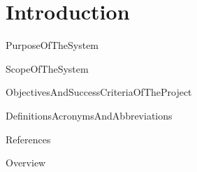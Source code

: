 \chapter{Introduction}


{PurposeOfTheSystem}

{ScopeOfTheSystem}

{ObjectivesAndSuccessCriteriaOfTheProject}

{DefinitionsAcronymsAndAbbreviations}

{References}	

{Overview}